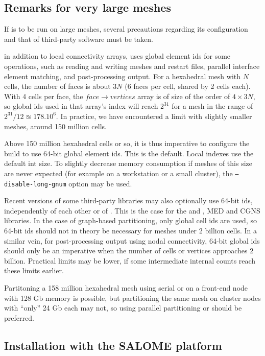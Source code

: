 \documentclass[a4paper,10pt,twoside]{csshortdoc}
\begin{document}
\subsection{Remarks for very large meshes\label{sec:config:largemesh}}

If \CS is to be run on large meshes, several precautions regarding
its configuration and that of third-party software must be taken.

in addition to local connectivity arrays, \CS uses global element ids
for some operations, such as reading and writing meshes and restart files,
parallel interface element matching, and post-processing output.
For a hexahedral mesh with $N$ cells,
the number of faces is about $3N$ (6 faces per cell, shared by 2 cells each).
With 4 cells per face, the $face \rightarrow vertices$ array is of size
of the order of $4\times3N$, so global ids used in that array's index
will reach $2^{31}$ for a mesh in the range of $2^{31} / 12 \approxeq 178.10^6$.
In practice, we have encountered a limit with slightly smaller meshes,
around 150 million cells.

Above 150 million hexahedral cells or so, it is thus imperative to configure
the build to use 64-bit global element ids. This is the default.
Local indexes use the default {int} size. To slightly decrease memory
consumption if meshes of this size are never expected (for example on a workstation
or a small cluster), the {\tt --disable-long-gnum} option may be used.

Recent versions of some third-party libraries may also optionally use 64-bit ids,
independently of each other or of \CS.
This is the case for the \scotch and \metis, MED and
CGNS libraries. In the case of graph-based partitioning, only
global cell ids are used, so 64-bit ids should not in theory be necessary
for meshes under 2 billion cells. In a similar vein, for post-processing output
using nodal connectivity, 64-bit global ids should only be an imperative
when the number of cells or vertices approaches 2 billion.
Practical limits may be lower, if some intermediate internal counts
reach these limits earlier.

Partitoning a 158 million hexahedral mesh using serial  or \scotch
on a front-end node with 128 Gb memory is possible,
but partitioning the same mesh on cluster nodes with ``only'' 24 Gb each
may not, so using parallel partitioning \ptscotch or \parmetis
should be preferred.

\subsection{Installation with the SALOME platform\label{sec:config:salome}}
\end{document}
